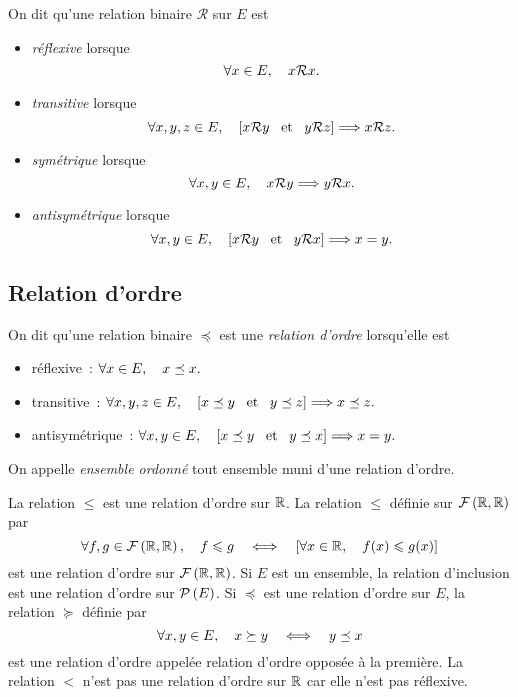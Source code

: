 \documentclass{magnoliaold}
\begin{document}
\begin{definition}[utile=-3]
On dit qu'une relation binaire $\mathcal{R}$ sur $E$ est
\begin{itemize}
\item \emph{réflexive} lorsque
  \[\forall x\in E ,\quad x\mathcal{R} x.\]
\item \emph{transitive} lorsque
  \[\forall x,y,z\in E ,\quad \left[x\mathcal{R} y \quad\!\text{et}\quad\! y\mathcal{R} z\right] \Longrightarrow
    x\mathcal{R} z.\]
\item \emph{symétrique} lorsque
  \[\forall x,y\in E ,\quad x\mathcal{R} y \Longrightarrow y\mathcal{R} x.\]
\item \emph{antisymétrique} lorsque
  \[\forall x,y\in E ,\quad \left[x \mathcal{R}y \quad\!\text{et}\quad\! y\mathcal{R} x\right] \Longrightarrow
    x=y.\]
\end{itemize}
\end{definition}

\subsection{Relation d'ordre}

\begin{definition}[utile=-3]
On dit qu'une relation binaire $\preceq$ est une
\emph{relation d'ordre} lorsqu'elle est
\begin{itemize}
\item réflexive~: $\forall x\in E ,\quad x\preceq x.$
\item transitive~: $\forall x,y,z\in E ,\quad \left[x\preceq y \quad\!\text{et}\quad\! y\preceq z\right]
  \Longrightarrow x\preceq z.$
\item antisymétrique~: $\forall x,y\in E ,\quad \left[x\preceq y \quad\!\text{et}\quad\! y\preceq x\right]
  \Longrightarrow x=y.$
\end{itemize}
On appelle \emph{ensemble ordonné} tout ensemble muni d'une relation d'ordre.
\end{definition}

\begin{remarques}
\remarque La relation $\leq$ est une relation d'ordre sur $\mathbb{R}$.  La relation
  $\leq$ définie sur $\mathcal{F}\left(\mathbb{R},\mathbb{R}\right)$ par
  \[\forall f,g\in\mathcal{F}\left(\mathbb{R},\mathbb{R}\right) ,\quad f\leqslant g \quad\Longleftrightarrow\quad
    \left[\forall x\in\mathbb{R} ,\quad f(x)\leqslant g(x)\right]\]
  est une relation d'ordre sur $\mathcal{F}\left(\mathbb{R},\mathbb{R}\right)$.
 \remarque Si $E$ est un ensemble,
  la relation d'inclusion est une relation d'ordre sur $\mathcal{P}\left(E\right)$. 
\remarque Si $\preceq$ est une relation d'ordre sur $E$, la relation
  $\succeq$ définie par
  \[\forall x,y\in E ,\quad x\succeq y \quad\Longleftrightarrow\quad y\preceq x\]
  est une relation d'ordre appelée relation d'ordre opposée à la première.
\remarque La relation $<$ n'est pas une relation d'ordre sur $\mathbb{R}$ car elle
  n'est pas réflexive.
\end{remarques}
\end{document}
